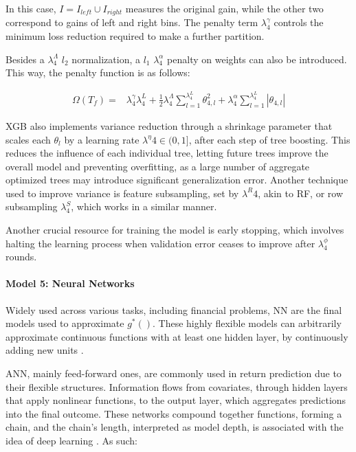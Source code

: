 \documentclass[preprint,12pt,authoryear]{elsarticle}
\begin{document}
In this case, $I = I_{left} \cup I_{right}$ measures the original gain, while the other two correspond to gains of left and right bins. The penalty term $\lambda^{\gamma}_{4}$ controls the minimum loss reduction required to make a further partition.

Besides a $\lambda^{\Lambda}_{4}$ $l_{2}$ normalization, a $l_{1}$ $\lambda^{\alpha}_{4}$ penalty on weights can also be introduced. This way, the penalty function is as follows:

\begin{align}
\Omega(T_{f}) = & \lambda^{\gamma}_{4}  \lambda^{L}_{4} + 
 \frac{1}{2}\lambda^{\Lambda}_{4} \sum_{l=1}^{\lambda^{L}_{4}}\theta_{4,l}^2 +
\lambda^{\alpha}_{4}\sum_{l=1}^{\lambda^{L}_{4}}|\theta_{4,l}|
\end{align}

XGB also implements variance reduction through a shrinkage parameter that scales each $\theta_{l}$ by a learning rate $\lambda^{\eta}{4} \in (0,1]$, after each step of tree boosting. This reduces the influence of each individual tree, letting future trees improve the overall model and preventing overfitting, as a large number of aggregate optimized trees may introduce significant generalization error. Another technique used to improve variance is feature subsampling, set by $\lambda^{R}{4}$, akin to RF, or row subsampling $\lambda^{S}_{4}$, which works in a similar manner.

Another crucial resource for training the model is early stopping, which involves halting the learning process when validation error ceases to improve after $\lambda^{\phi}_{4}$ rounds.


\paragraph{Model 5: Neural Networks}

Widely used across various tasks, including financial problems, NN are the final models used to approximate $g^{*}()$. These highly flexible models can arbitrarily approximate continuous functions with at least one hidden layer, by continuously adding new units \citep{costarellispiglervinti2016}.

ANN, mainly feed-forward ones, are commonly used in return prediction due to their flexible structures. Information flows from covariates, through hidden layers that apply nonlinear functions, to the output layer, which aggregates predictions into the final outcome. These networks compound together functions, forming a chain, and the chain's length, interpreted as model depth, is associated with the idea of deep learning \citep{Goodfellow-et-al-2016}. As such:
\end{document}
